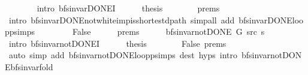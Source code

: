 \begin{isabellebody}
\ \ \ \ \ \ \isamarkupfalse%
\ {\isacharparenleft}{\kern0pt}intro\ bfs{\isacharunderscore}{\kern0pt}invar{\isacharunderscore}{\kern0pt}DONE{\isacharprime}{\kern0pt}I{\isacharparenright}{\kern0pt}\isanewline
\ \ \ \ \isamarkupfalse%
\ {\isacharquery}{\kern0pt}thesis\isanewline
\ \ \ \ \ \ \isamarkupfalse%
\ {\isachardoublequoteopen}{}{\isachardot}{\kern0pt}prems{\isachardoublequoteclose}{\isacharparenleft}{\kern0pt}{}{\isacharparenright}{\kern0pt}\isanewline
\ \ \ \ \ \ \isamarkupfalse%
\ {\isacharparenleft}{\kern0pt}intro\ bfs{\isacharunderscore}{\kern0pt}invar{\isacharunderscore}{\kern0pt}DONE{\isachardot}{\kern0pt}not{\isacharunderscore}{\kern0pt}white{\isacharunderscore}{\kern0pt}imp{\isacharunderscore}{\kern0pt}is{\isacharunderscore}{\kern0pt}shortest{\isacharunderscore}{\kern0pt}dpath{\isacharparenright}{\kern0pt}\ {\isacharparenleft}{\kern0pt}simp{\isacharunderscore}{\kern0pt}all\ add{\isacharcolon}{\kern0pt}\ bfs{\isacharunderscore}{\kern0pt}invar{\isacharunderscore}{\kern0pt}DONE{\isachardot}{\kern0pt}loop{\isacharunderscore}{\kern0pt}psimps{\isacharparenright}{\kern0pt}\isanewline
\ \ \isamarkupfalse%
\isanewline
\ \ \ \ \isamarkupfalse%
\ False\isanewline
\ \ \ \ \isamarkupfalse%
\ {\isachardoublequoteopen}{}{\isachardot}{\kern0pt}prems{\isachardoublequoteclose}{\isacharparenleft}{\kern0pt}{}{\isacharparenright}{\kern0pt}\isanewline
\ \ \ \ \isamarkupfalse%
\ {\isachardoublequoteopen}bfs{\isacharunderscore}{\kern0pt}invar{\isacharunderscore}{\kern0pt}not{\isacharunderscore}{\kern0pt}DONE{\isacharprime}{\kern0pt}\ G\ src\ s{\isachardoublequoteclose}\isanewline
\ \ \ \ \ \ \isamarkupfalse%
\ {\isacharparenleft}{\kern0pt}intro\ bfs{\isacharunderscore}{\kern0pt}invar{\isacharunderscore}{\kern0pt}not{\isacharunderscore}{\kern0pt}DONE{\isacharprime}{\kern0pt}I{\isacharparenright}{\kern0pt}\isanewline
\ \ \ \ \isamarkupfalse%
\ {\isacharquery}{\kern0pt}thesis\isanewline
\ \ \ \ \ \ \isamarkupfalse%
\ False\ {\isachardoublequoteopen}{}{\isachardot}{\kern0pt}prems{\isachardoublequoteclose}{\isacharparenleft}{\kern0pt}{}{\isacharparenright}{\kern0pt}\isanewline
\ \ \ \ \ \ \isamarkupfalse%
\ {\isacharparenleft}{\kern0pt}auto\ simp\ add{\isacharcolon}{\kern0pt}\ bfs{\isacharunderscore}{\kern0pt}invar{\isacharunderscore}{\kern0pt}not{\isacharunderscore}{\kern0pt}DONE{\isachardot}{\kern0pt}loop{\isacharunderscore}{\kern0pt}psimps\ dest{\isacharcolon}{\kern0pt}\ {\isachardoublequoteopen}{}{\isachardot}{\kern0pt}hyps{\isachardoublequoteclose}\ intro{\isacharcolon}{\kern0pt}\ bfs{\isacharunderscore}{\kern0pt}invar{\isacharunderscore}{\kern0pt}not{\isacharunderscore}{\kern0pt}DONE{\isachardot}{\kern0pt}bfs{\isacharunderscore}{\kern0pt}invar{\isacharunderscore}{\kern0pt}fold{\isacharparenright}{\kern0pt}\isanewline

\end{isabellebody}
